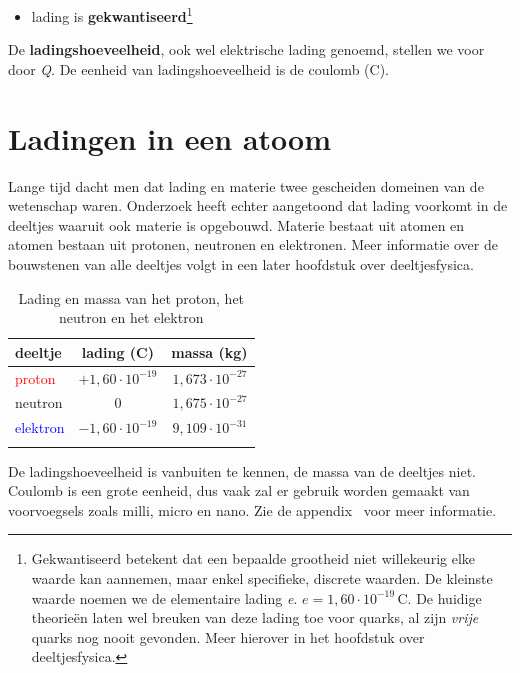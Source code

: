 \documentclass{ximera}
\begin{document}
	\begin{itemize}
	\item lading is \textbf{gekwantiseerd}\footnote{Gekwantiseerd betekent dat een bepaalde grootheid niet willekeurig elke waarde kan aannemen, maar enkel specifieke, discrete waarden. De kleinste waarde noemen we de elementaire lading \textit{e}. $e=1{,}60\cdot 10^{-19}\,\mathrm{C}$. De huidige theorieën laten wel breuken van deze lading toe voor quarks, al zijn \textit{vrije} quarks nog nooit gevonden. Meer hierover in het hoofdstuk over deeltjesfysica.}%
\end{itemize}

\begin{definition}
	De \textbf{ladingshoeveelheid}, ook wel elektrische lading genoemd, stellen we voor door \textit{Q}. De eenheid van ladingshoeveelheid is de coulomb (C).
\end{definition}

\section{Ladingen in een atoom}

Lange tijd dacht men dat lading en materie twee gescheiden domeinen van de wetenschap waren. Onderzoek heeft echter aangetoond dat lading voorkomt in de deeltjes waaruit ook materie is opgebouwd. Materie bestaat uit atomen en atomen bestaan uit protonen, neutronen en elektronen. Meer informatie over de bouwstenen van alle deeltjes volgt in een later hoofdstuk over deeltjesfysica.

\begin{table}[h!]
\caption{Lading en massa van het proton, het neutron en het elektron}
\centering
\begin{tabular}{@{}lcr@{}}
	\toprule
	deeltje & lading (C) & massa (kg)\\
	\midrule
	\textcolor{red}{proton} & $+1{,}60\cdot 10^{-19}$ & $1{,}673\cdot 10^{-27}$ \\
	neutron & 0 & $1{,}675\cdot 10^{-27}$ \\
	\textcolor{blue}{elektron} & $-1{,}60\cdot 10^{-19}$ & $9{,}109\cdot 10^{-31}$ \\
	\bottomrule
	\label{tabel:ladingen_proton_elektron}
\end{tabular}
\vspace{2mm}
	\begin{remark}
		De ladingshoeveelheid is vanbuiten te kennen, de massa van de deeltjes niet. Coulomb is een grote eenheid, dus vaak zal er gebruik worden gemaakt van voorvoegsels zoals milli, micro en nano. Zie de appendix~ voor meer informatie.%
	\end{remark}
\end{table}
\end{document}
